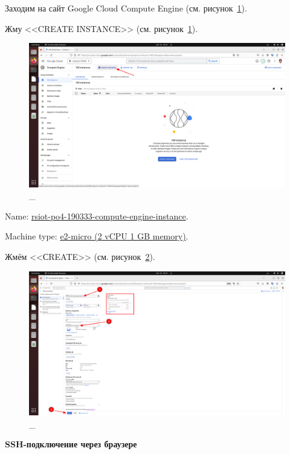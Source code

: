 \documentclass[12pt, a4paper, simple]{eskdtext}
\begin{document}
  \newpage
  Заходим на сайт Google Cloud Compute Engine \cite{GoogleCloudComputeEngine} (см. рисунок~\ref{fig:6}).

  Жму <<CREATE INSTANCE>> (см. рисунок~\ref{fig:6}).

  \begin{figure}[!h]
    \centering
    \includegraphics[width=16cm]
    {images/2023-02-25_20-53-33.png}
    \caption{\_}
    \label{fig:6}
  \end{figure}

  Name: \underline{rsiot-po4-190333-compute-engine-instance}.

  Machine type: \underline{e2-micro (2 vCPU 1 GB memory)}.

  Жмём <<СREATE>> (см. рисунок~\ref{fig:7}).

  \begin{figure}[!h]
    \centering
    \includegraphics[width=16cm]
    {images/2023-02-25_20-58-22.png}
    \caption{\_}
    \label{fig:7}
  \end{figure}

  \newpage
  \textbf{SSH-подключение через браузере}
\end{document}
